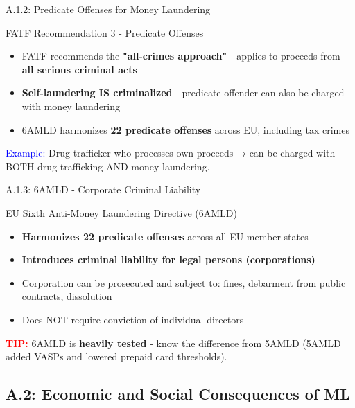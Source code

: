 \documentclass{beamer}
\begin{document}
	\begin{frame}{A.1.2: Predicate Offenses for Money Laundering}
		\begin{block}{FATF Recommendation 3 - Predicate Offenses}
			\begin{itemize}
				\item FATF recommends the \textbf{"all-crimes approach"} - applies to proceeds from \textbf{all serious criminal acts}
				\item \textbf{Self-laundering IS criminalized} - predicate offender can also be charged with money laundering
				\item 6AMLD harmonizes \textbf{22 predicate offenses} across EU, including tax crimes
			\end{itemize}
		\end{block}
		\vspace{0.3cm}
		\textcolor{blue}{Example:} Drug trafficker who processes own proceeds → can be charged with BOTH drug trafficking AND money laundering.
	\end{frame}
	
	\begin{frame}{A.1.3: 6AMLD - Corporate Criminal Liability}
		\begin{block}{EU Sixth Anti-Money Laundering Directive (6AMLD)}
			\begin{itemize}
				\item \textbf{Harmonizes 22 predicate offenses} across all EU member states
				\item \textbf{Introduces criminal liability for legal persons (corporations)}
				\item Corporation can be prosecuted and subject to: fines, debarment from public contracts, dissolution
				\item Does NOT require conviction of individual directors
			\end{itemize}
		\end{block}
		\textcolor{red}{\textbf{TIP:}} 6AMLD is \textbf{heavily tested} - know the difference from 5AMLD (5AMLD added VASPs and lowered prepaid card thresholds).
	\end{frame}
	
	\subsection{A.2: Economic and Social Consequences of ML}
	
\end{document}
